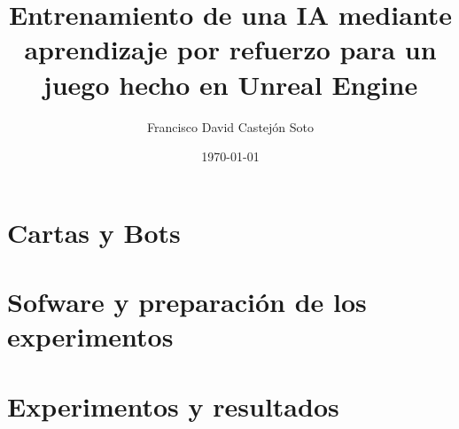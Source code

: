 \documentclass[11pt, a4paper]{book}
\author{Francisco David Castejón Soto}
\title{Entrenamiento de una IA mediante aprendizaje por refuerzo para un juego hecho en Unreal Engine}
\date{\today}
\begin{document}
\frontmatter





\cleardoublepage
\tableofcontents

\cleardoublepage
\listoffigures

\cleardoublepage
\listoftables

\mainmatter

\part{Cartas y Bots} \label{part:idea}







\part{Sofware y preparación de los experimentos} \label{part:preparacion}



\part{Experimentos y resultados} \label{part:resultados}





\backmatter

\cleardoublepage



% 
\end{document}
